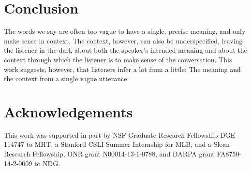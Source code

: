 \documentclass[doc]{apa6}
\begin{document}
%
%
%


\section{Conclusion}

The words we say are often too vague to have a single, precise meaning,
and only make sense in context. The context, however, can also be
underspecified, leaving the listener in the dark about both the
speaker's intended meaning and about the context through which the
listener is to make sense of the conversation. This work suggests,
however, that listeners infer a lot from a little:
The meaning and the context from a single vague utterance.


\section{Acknowledgements}

This work was supported in part by NSF Graduate Research Fellowship
DGE-114747 to MHT, a Stanford CSLI Summer Internship for MLB, and a
Sloan Research Fellowship, ONR grant N00014-13-1-0788, and DARPA grant
FA8750-14-2-0009 to NDG.
\end{document}
